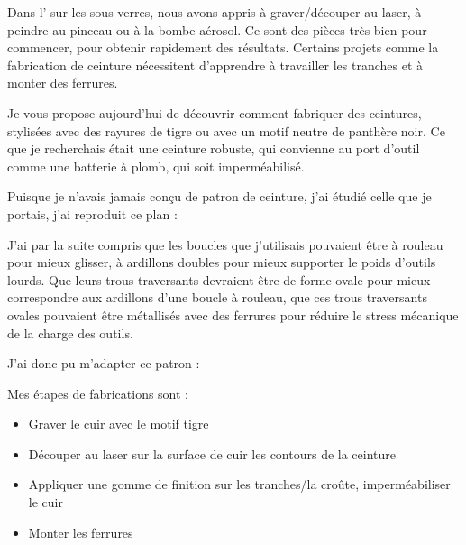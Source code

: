 \documentclass[a4paper,11pt]{article}
\title{
  \blogtitle{Des ceintures tigres et panthères !}
}
\author{}
\date{}
\begin{document}

\maketitle

\thispagestyle{first}
\begin{blogmain}
Dans l' sur les sous-verres, nous avons appris à graver/découper au laser, à peindre au pinceau ou à la bombe aérosol.
Ce sont des pièces très bien pour commencer, pour obtenir rapidement des résultats.
Certains projets comme la fabrication de ceinture nécessitent d’apprendre à travailler les tranches et à monter des ferrures.

Je vous propose aujourd'hui de découvrir comment fabriquer des ceintures, stylisées avec des rayures de tigre ou avec un motif neutre de panthère noir.
Ce que je recherchais était une ceinture robuste, qui convienne au port d'outil comme une batterie à plomb, qui soit imperméabilisé.

Puisque je n'avais jamais conçu de patron de ceinture, j'ai étudié celle que je portais, j'ai reproduit ce plan :


J'ai par la suite compris que les boucles que j'utilisais pouvaient être à rouleau pour mieux glisser, à ardillons doubles pour mieux supporter le poids d'outils lourds. Que leurs trous traversants devraient être de forme ovale pour mieux correspondre aux ardillons d'une boucle à rouleau, que ces trous traversants ovales pouvaient être métallisés avec des ferrures pour réduire le stress mécanique de la charge des outils.

J'ai donc pu m'adapter ce patron :


Mes étapes de fabrications sont :
\begin{itemize}
  \item Graver le cuir avec le motif tigre
  \item Découper au laser sur la surface de cuir les contours de la ceinture 
  \item Appliquer une gomme de finition sur les tranches/la croûte, imperméabiliser le cuir
  \item Monter les ferrures
\end{itemize}


\end{blogmain}
\end{document}
